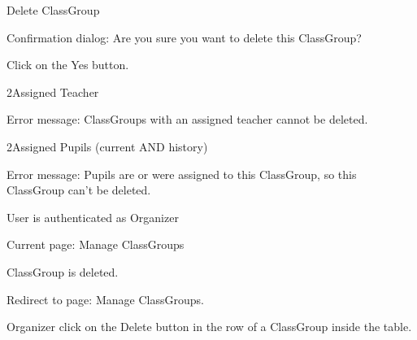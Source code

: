 
\begin{uc}{Delete ClassGroup}


    \begin{uc-mss}
    \item Confirmation dialog: Are you sure you want to delete this ClassGroup?
    \item Click on the Yes button.
    \end{uc-mss}

    \begin{uc-ext}

        \begin{uc-fail}{2}{Assigned Teacher}
        \item Error message: ClassGroups with an assigned teacher cannot be deleted.
        \end{uc-fail}

        \begin{uc-fail}{2}{Assigned Pupils (current AND history)}
        \item Error message: Pupils are or were assigned to this ClassGroup, so this
        ClassGroup can't be deleted.
        \end{uc-fail}

    \end{uc-ext}

    \begin{uc-pre}
    \item User is authenticated as Organizer
    \item Current page: Manage ClassGroups
    \end{uc-pre}

    \begin{uc-post}
    \item ClassGroup is deleted.
    \item Redirect to page: Manage ClassGroups.
    \end{uc-post}

    \begin{uc-trig}
        Organizer click on the Delete button in the row of a ClassGroup inside the table.
    \end{uc-trig}

\end{uc}

